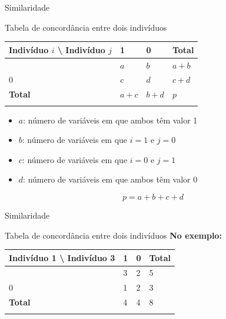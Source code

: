 \documentclass[
  ignorenonframetext,
  aspectratio=169,
]{beamer}
\newcounter{none} %
\providecommand{\tightlist}{%
  \setlength{\itemsep}{0pt}\setlength{\parskip}{0pt}}
\begin{document}
\begin{frame}{Similaridade}
\protect{}\label{similaridade-9}
\begin{block}{Tabela de concordância entre dois indivíduos}
\protect{}\label{tabela-de-concorduxe2ncia-entre-dois-indivuxedduos}
{\def\LTcaptype{none} %
\begin{longtable}[]{@{}llll@{}}
\toprule\noalign{}
Indivíduo \(i\) \textbackslash{} Indivíduo \(j\) & 1 & 0 & Total \\
\midrule\noalign{}
\endhead
1 & \(a\) & \(b\) & \(a + b\) \\
0 & \(c\) & \(d\) & \(c + d\) \\
\textbf{Total} & \(a + c\) & \(b + d\) & \(p\) \\
\bottomrule\noalign{}
\end{longtable}
}

\begin{itemize}
\tightlist
\item
  \(a\): número de variáveis em que ambos têm valor 1
\item
  \(b\): número de variáveis em que \(i=1\) e \(j=0\)
\item
  \(c\): número de variáveis em que \(i=0\) e \(j=1\)
\item
  \(d\): número de variáveis em que ambos têm valor 0
\end{itemize}

\[p = a + b + c + d\]
\end{block}
\end{frame}

\begin{frame}{Similaridade}
\protect{}\label{similaridade-10}
\begin{block}{Tabela de concordância entre dois indivíduos}
\protect{}\label{tabela-de-concorduxe2ncia-entre-dois-indivuxedduos-1}
\textbf{No exemplo:}

{\def\LTcaptype{none} %
\begin{longtable}[]{@{}llll@{}}
\toprule\noalign{}
Indivíduo 1 \textbackslash{} Indivíduo 3 & 1 & 0 & Total \\
\midrule\noalign{}
\endhead
1 & 3 & 2 & 5 \\
0 & 1 & 2 & 3 \\
\textbf{Total} & 4 & 4 & 8 \\
\bottomrule\noalign{}
\end{longtable}
}
\end{block}
\end{frame}
\end{document}
